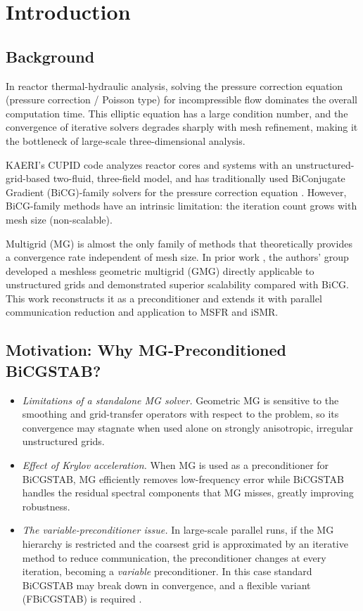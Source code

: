 \documentclass[review]{elsarticle}
\begin{document}
\linenumbers

\section{Introduction}
\label{Section:Introduction}

\subsection{Background}
In reactor thermal-hydraulic analysis, solving the pressure correction equation (pressure correction / Poisson type) for incompressible flow dominates the overall computation time. This elliptic equation has a large condition number, and the convergence of iterative solvers degrades sharply with mesh refinement, making it the bottleneck of large-scale three-dimensional analysis.

KAERI's CUPID code analyzes reactor cores and systems with an unstructured-grid-based two-fluid, three-field model, and has traditionally used BiConjugate Gradient (BiCG)-family solvers for the pressure correction equation \cite{do2024meshless}. However, BiCG-family methods have an intrinsic limitation: the iteration count grows with mesh size (non-scalable).

Multigrid (MG) is almost the only family of methods that theoretically provides a convergence rate independent of mesh size. In prior work \cite{do2024meshless, do2022highaspect, ha2024aiaa}, the authors' group developed a meshless geometric multigrid (GMG) directly applicable to unstructured grids and demonstrated superior scalability compared with BiCG. This work reconstructs it as a preconditioner and extends it with parallel communication reduction and application to MSFR and iSMR.

\subsection{Motivation: Why MG-Preconditioned BiCGSTAB?}
\begin{itemize}
  \item \emph{Limitations of a standalone MG solver.} Geometric MG is sensitive to the smoothing and grid-transfer operators with respect to the problem, so its convergence may stagnate when used alone on strongly anisotropic, irregular unstructured grids.
  \item \emph{Effect of Krylov acceleration.} When MG is used as a preconditioner for BiCGSTAB, MG efficiently removes low-frequency error while BiCGSTAB handles the residual spectral components that MG misses, greatly improving robustness.
  \item \emph{The variable-preconditioner issue.} In large-scale parallel runs, if the MG hierarchy is restricted and the coarsest grid is approximated by an iterative method to reduce communication, the preconditioner changes at every iteration, becoming a \emph{variable} preconditioner. In this case standard BiCGSTAB may break down in convergence, and a flexible variant (FBiCGSTAB) is required \cite{chen2016fbicgstab}.
\end{itemize}
\end{document}
